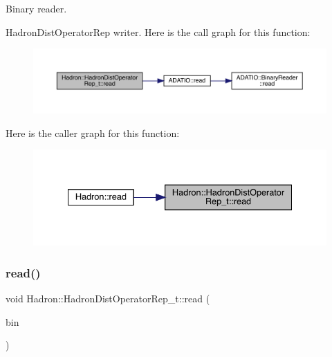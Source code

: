 Binary reader. 

Hadron\+Dist\+Operator\+Rep writer. Here is the call graph for this function\+:
\nopagebreak
\begin{figure}[H]
\begin{center}
\leavevmode
\includegraphics[width=350pt]{dd/de0/classHadron_1_1HadronDistOperatorRep__t_a17387b2569f243bf0aecc9c6f4160051_cgraph}
\end{center}
\end{figure}
Here is the caller graph for this function\+:
\nopagebreak
\begin{figure}[H]
\begin{center}
\leavevmode
\includegraphics[width=334pt]{dd/de0/classHadron_1_1HadronDistOperatorRep__t_a17387b2569f243bf0aecc9c6f4160051_icgraph}
\end{center}
\end{figure}
\mbox{\label{classHadron_1_1HadronDistOperatorRep__t_a17387b2569f243bf0aecc9c6f4160051}} 
\subsubsection{\texorpdfstring{read()}{read()}\hspace{0.1cm}{\footnotesize\ttfamily [2/2]}}
{\footnotesize\ttfamily void Hadron\+::\+Hadron\+Dist\+Operator\+Rep\+\_\+t\+::read (\begin{DoxyParamCaption}\item[{\mbox{\hyperlink{classADATIO_1_1BinaryReader}{A\+D\+A\+T\+I\+O\+::\+Binary\+Reader}} \&}]{bin }\end{DoxyParamCaption})}



